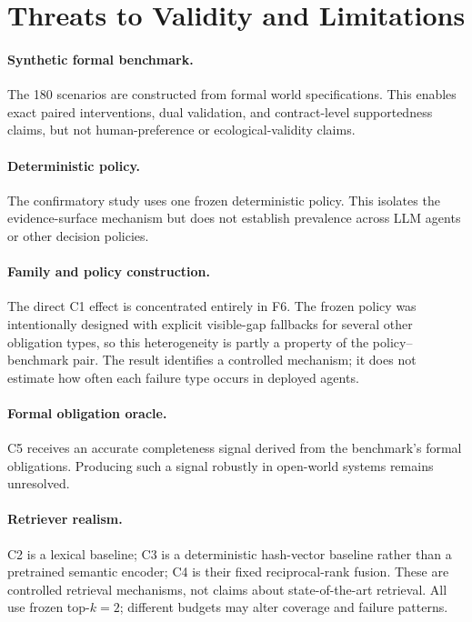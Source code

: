 
\section{Threats to Validity and Limitations}
\label{sec:limitations}

\paragraph{Synthetic formal benchmark.}
The 180 scenarios are constructed from formal world specifications. This enables exact
paired interventions, dual validation, and contract-level supportedness claims, but not
human-preference or ecological-validity claims.

\paragraph{Deterministic policy.}
The confirmatory study uses one frozen deterministic policy. This isolates the
evidence-surface mechanism but does not establish prevalence across LLM agents or other
decision policies.

\paragraph{Family and policy construction.}
The direct C1 effect is concentrated entirely in F6. The frozen policy was intentionally
designed with explicit visible-gap fallbacks for several other obligation types, so this
heterogeneity is partly a property of the policy--benchmark pair. The result identifies a
controlled mechanism; it does not estimate how often each failure type occurs in deployed
agents.

\paragraph{Formal obligation oracle.}
C5 receives an accurate completeness signal derived from the benchmark's formal
obligations. Producing such a signal robustly in open-world systems remains unresolved.

\paragraph{Retriever realism.}
C2 is a lexical baseline; C3 is a deterministic hash-vector baseline rather than a
pretrained semantic encoder; C4 is their fixed reciprocal-rank fusion. These are controlled
retrieval mechanisms, not claims about state-of-the-art retrieval. All use frozen
top-$k=2$; different budgets may alter coverage and failure patterns.

